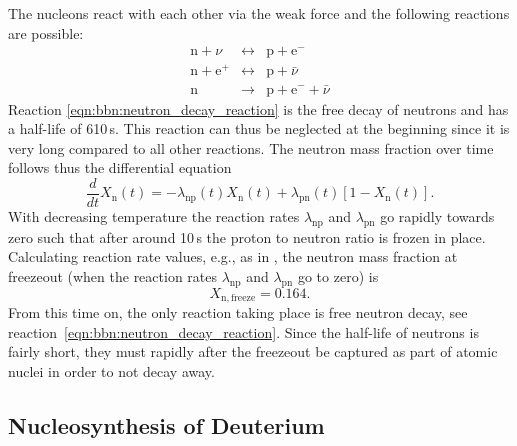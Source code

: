 The nucleons react with each other via the weak force and the following reactions are possible:
\begin{eqnarray}
    \mathrm{n} + \nu &\longleftrightarrow& \mathrm{p} + \mathrm{e}^{-} \\
    \mathrm{n} + \mathrm{e}^{+} &\longleftrightarrow& \mathrm{p} + \bar{\nu} \\
    \mathrm{n} &\longrightarrow& \mathrm{p} + \mathrm{e}^{-} + \bar{\nu} \label{eqn:bbn:neutron_decay_reaction}
\end{eqnarray}
Reaction \eqref{eqn:bbn:neutron_decay_reaction} is the free decay of neutrons and has a half-life of 610\,s. This reaction can thus be neglected at the beginning since it is very long compared to all other reactions. The neutron mass fraction over time follows thus the differential equation
\begin{equation}
    \frac{d}{dt}X_\mathrm{n}(t) = -\lambda_\mathrm{np}(t)X_\mathrm{n}(t) + \lambda_\mathrm{pn}(t)[1-X_\mathrm{n}(t)].
\end{equation}
With decreasing temperature the reaction rates $\lambda_\mathrm{np}$ and $\lambda_\mathrm{pn}$ go rapidly towards zero such that after around 10\,s the proton to neutron ratio is frozen in place. Calculating reaction rate values, e.g., as in \citet{peebles66apj}, the neutron mass fraction at freezeout (when the reaction rates $\lambda_\mathrm{np}$ and $\lambda_\mathrm{pn}$ go to zero) is
\begin{equation}
    X_\mathrm{n,freeze} = 0.164.
\end{equation}
From this time on, the only reaction taking place is free neutron decay, see reaction~\eqref{eqn:bbn:neutron_decay_reaction}. Since the half-life of neutrons is fairly short, they must rapidly after the freezeout be captured as part of atomic nuclei in order to not decay away.


\subsection{Nucleosynthesis of Deuterium}

